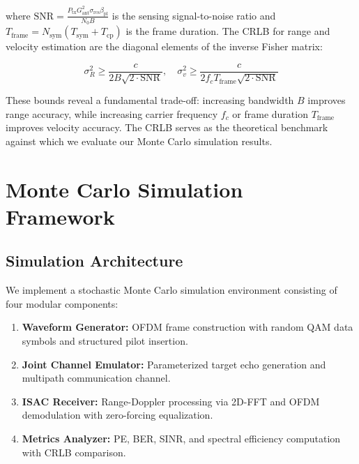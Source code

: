 \documentclass[conference]{IEEEtran}
\begin{document}
where $\mathrm{SNR} = \frac{P_{\mathrm{tx}} G_{\mathrm{ant}}^2 \sigma_{\mathrm{rcs}} \beta_{\mathrm{pl}}}{N_0 B}$ is the sensing signal-to-noise ratio and $T_{\mathrm{frame}} = N_{\mathrm{sym}} (T_{\mathrm{sym}} + T_{\mathrm{cp}})$ is the frame duration. The CRLB for range and velocity estimation are the diagonal elements of the inverse Fisher matrix:

\begin{equation}
    \sigma_R^2 \geq \frac{c}{2B\sqrt{2 \cdot \mathrm{SNR}}}, \quad 
    \sigma_v^2 \geq \frac{c}{2f_c T_{\mathrm{frame}} \sqrt{2 \cdot \mathrm{SNR}}}
    \label{eq:crlb}
\end{equation}

These bounds reveal a fundamental trade-off: increasing bandwidth $B$ improves range accuracy, while increasing carrier frequency $f_c$ or frame duration $T_{\mathrm{frame}}$ improves velocity accuracy. The CRLB serves as the theoretical benchmark against which we evaluate our Monte Carlo simulation results.

\section{Monte Carlo Simulation Framework}

\subsection{Simulation Architecture}

We implement a stochastic Monte Carlo simulation environment consisting of four modular components:

\begin{enumerate}
    \item \textbf{Waveform Generator:} OFDM frame construction with random QAM data symbols and structured pilot insertion.
    \item \textbf{Joint Channel Emulator:} Parameterized target echo generation and multipath communication channel.
    \item \textbf{ISAC Receiver:} Range-Doppler processing via 2D-FFT and OFDM demodulation with zero-forcing equalization.
    \item \textbf{Metrics Analyzer:} PE, BER, SINR, and spectral efficiency computation with CRLB comparison.
\end{enumerate}
\end{document}
